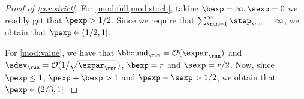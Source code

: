 \begin{proof}[Proof of \cref{cor:strict}]
For \cref{mod:full,mod:stoch}, taking $\bexp = \infty, \sexp = 0$ we readily get that $\pexp > 1/2$. Since we require that $\sum_{\run=1}^{\infty}\step_\run = \infty$, we obtain that $\pexp \in (1/2,1]$. 

For \cref{mod:value}, we have that $\curr[\bbound] = \bigoh(\curr[\expar])$ and $\curr[\sdev] = \bigoh(1/\sqrt{\curr[\expar]})$, \ie $\bexp = r$ and $\sexp = r/2$. Now, since $\pexp \leq 1$, $\pexp + \bexp >1$ and $\pexp - \sexp > 1/2$, we obtain that $\pexp \in (2/3,1]$. 
\end{proof}